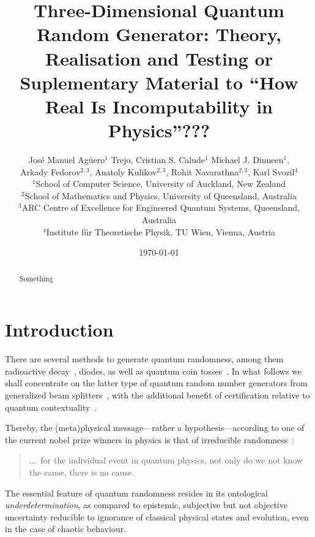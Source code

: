 \documentclass[11pt,a4paper]{article}
\begin{document}
\title{Three-Dimensional Quantum Random Generator: Theory, Realisation and Testing or\\
Suplementary Material to ``How Real Is Incomputability in Physics''???}
\author{Jos\'{e} Manuel Ag\"{u}ero$^{1}$
         Trejo, Cristian S. Calude$^{1}$
         Michael J. Dinneen$^{1}$,\\
         Arkady Fedorov$^{2,3}$, Anatoly Kulikov$^{2,3}$, Rohit Navarathna$^{2,3}$, Karl Svozil$^{4}$\\[3ex]$^{1}$School of Computer Science, University of Auckland, New Zealand\\
         $^{2}$School of Mathematics and Physics, University of Queensland, Australia\\
         $^{3}$ARC Centre of Excellence for Engineered Quantum Systems, Queensland, Australia\\
         $^{4}$Institute f\"ur Theoretische Physik, TU Wien, Vienna, Austria}
\date{\today}


\maketitle

\begin{abstract}
Something
\end{abstract}

\cite{PhysRevLett.119.240501,Abbott_2019}
\section{Introduction}

There are several methods to generate quantum randomness, among them radioactive decay~\cite{Kohlrausch1926,Kragh-2009_RePoss5},
diodes, as well as quantum coin tosses~\cite{svozil-qct,zeilinger:qct,Quantis}.
In what follows we shall concentrate on the latter type of quantum random number generators from generalized beam splitters~\cite{rzbb},
with the additional benefit of certification relative to quantum contextuality~\cite{svozil-2009-howto,10.1038/nature09008}.

Thereby, the (meta)physical message---rather a hypothesis---according
to one of the current nobel prize winners in physics is that of irreducible randomness~\cite{zeil-05_nature_ofQuantum}:
 \begin{quote}
$\ldots$~for the individual event in quantum physics, not only do we not know the cause, there is no cause.
 \end{quote}
The essential feature of quantum randomness resides in its ontological {\em underdetermination},
as compared to epistemic, subjective but not objective~\cite{Heisenberg1958-HEIPAP}
uncertainty reducible to ignorance of classical physical states and evolution, even in the case of chaotic behaviour.
\end{document}
